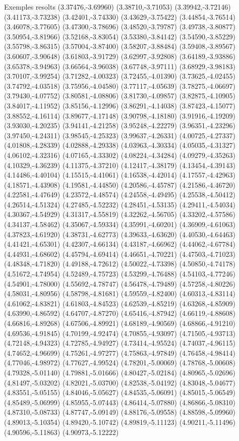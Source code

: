 \documentclass[11pt,a4paper]{article}
\begin{document}
\begin{fmex}{Exemples resolts}
(3.37476,-3.69960) (3.38710,-3.71053) (3.39942,-3.72146) (3.41173,-3.73238) (3.42401,-3.74330) (3.43629,-3.75422) (3.44854,-3.76514) (3.46078,-3.77605) (3.47300,-3.78696) (3.48520,-3.79787) (3.49738,-3.80877) (3.50954,-3.81966) (3.52168,-3.83054) (3.53380,-3.84142) (3.54590,-3.85229) (3.55798,-3.86315) (3.57004,-3.87400) (3.58207,-3.88484) (3.59408,-3.89567) (3.60607,-3.90648) (3.61803,-3.91729) (3.62997,-3.92808) (3.64189,-3.93886) (3.65378,-3.94963) (3.66564,-3.96038) (3.67748,-3.97111) (3.68929,-3.98183) (3.70107,-3.99254) (3.71282,-4.00323) (3.72455,-4.01390) (3.73625,-4.02455) (3.74792,-4.03518) (3.75956,-4.04580) (3.77117,-4.05639) (3.78275,-4.06697) (3.79430,-4.07752) (3.80581,-4.08806) (3.81730,-4.09857) (3.82875,-4.10905) (3.84017,-4.11952) (3.85156,-4.12996) (3.86291,-4.14038) (3.87423,-4.15077) (3.88552,-4.16114) (3.89677,-4.17148) (3.90798,-4.18180) (3.91916,-4.19209) (3.93030,-4.20235) (3.94141,-4.21258) (3.95248,-4.22279) (3.96351,-4.23296) (3.97450,-4.24311) (3.98545,-4.25323) (3.99637,-4.26331) (4.00725,-4.27337) (4.01808,-4.28339) (4.02888,-4.29338) (4.03963,-4.30334) (4.05035,-4.31327) (4.06102,-4.32316) (4.07165,-4.33302) (4.08224,-4.34284) (4.09279,-4.35263) (4.10329,-4.36239) (4.11375,-4.37210) (4.12417,-4.38179) (4.13454,-4.39143) (4.14486,-4.40104) (4.15515,-4.41061) (4.16538,-4.42014) (4.17557,-4.42963) (4.18571,-4.43908) (4.19581,-4.44850) (4.20586,-4.45787) (4.21586,-4.46720) (4.22581,-4.47649) (4.23572,-4.48574) (4.24558,-4.49495) (4.25538,-4.50412) (4.26514,-4.51324) (4.27485,-4.52232) (4.28451,-4.53135) (4.29411,-4.54034) (4.30367,-4.54929) (4.31317,-4.55819) (4.32262,-4.56705) (4.33202,-4.57586) (4.34137,-4.58462) (4.35067,-4.59334) (4.35991,-4.60201) (4.36909,-4.61063) (4.37823,-4.61920) (4.38731,-4.62773) (4.39633,-4.63620) (4.40530,-4.64463) (4.41421,-4.65301) (4.42307,-4.66134) (4.43187,-4.66962) (4.44062,-4.67784) (4.44931,-4.68602) (4.45794,-4.69414) (4.46651,-4.70221) (4.47503,-4.71023) (4.48348,-4.71820) (4.49188,-4.72612) (4.50022,-4.73398) (4.50850,-4.74178) (4.51672,-4.74954) (4.52489,-4.75723) (4.53299,-4.76488) (4.54103,-4.77246) (4.54901,-4.78000) (4.55692,-4.78747) (4.56478,-4.79489) (4.57258,-4.80226) (4.58031,-4.80956) (4.58798,-4.81681) (4.59559,-4.82400) (4.60313,-4.83114) (4.61062,-4.83821) (4.61803,-4.84523) (4.62539,-4.85219) (4.63268,-4.85909) (4.63990,-4.86592) (4.64707,-4.87270) (4.65416,-4.87942) (4.66119,-4.88608) (4.66816,-4.89268) (4.67506,-4.89921) (4.68189,-4.90569) (4.68866,-4.91210) (4.69536,-4.91845) (4.70199,-4.92474) (4.70855,-4.93097) (4.71505,-4.93713) (4.72148,-4.94323) (4.72785,-4.94927) (4.73414,-4.95524) (4.74037,-4.96115) (4.74652,-4.96699) (4.75261,-4.97277) (4.75863,-4.97849) (4.76458,-4.98414) (4.77046,-4.98972) (4.77627,-4.99524) (4.78201,-5.00069) (4.78768,-5.00608) (4.79328,-5.01140) (4.79881,-5.01666) (4.80427,-5.02184) (4.80965,-5.02696) (4.81497,-5.03202) (4.82021,-5.03700) (4.82538,-5.04192) (4.83048,-5.04677) (4.83551,-5.05155) (4.84046,-5.05627) (4.84535,-5.06091) (4.85015,-5.06549) (4.85489,-5.06999) (4.85955,-5.07443) (4.86414,-5.07880) (4.86866,-5.08310) (4.87310,-5.08733) (4.87747,-5.09149) (4.88176,-5.09558) (4.88598,-5.09960) (4.89013,-5.10354) (4.89420,-5.10742) (4.89819,-5.11123) (4.90211,-5.11496) (4.90596,-5.11863) (4.90973,-5.12222) 
\end{fmex}
\end{document}
